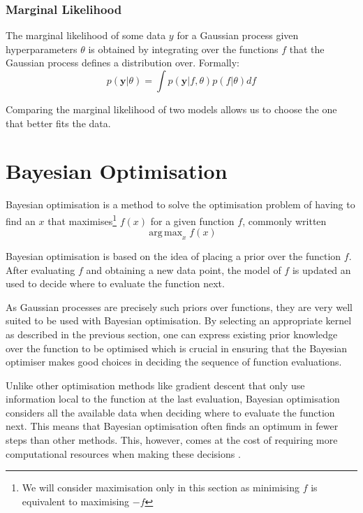 \documentclass[a4paper,12pt,twoside,openright]{report}
\DeclareMathOperator*{\argmax}{arg\,max}
\begin{document}

\subsubsection{Marginal Likelihood}
The marginal likelihood of some data $y$ for a Gaussian process given hyperparameters $\theta$ is obtained by integrating over the functions $f$ that the Gaussian process defines a distribution over. Formally:
\begin{equation}
p(\mathbf{y}|\theta) = \int p(\mathbf{y}|f, \theta)p(f|\theta) df
\end{equation}

Comparing the marginal likelihood of two models allows us to choose the one that better fits the data.

\section{Bayesian Optimisation}

Bayesian optimisation is a method to solve the optimisation problem of having to find an $x$ that maximises\footnote{We will consider maximisation only in this section as minimising $f$ is equivalent to maximising $-f$} $f(x)$ for a given function $f$, commonly written 
\begin{equation}
\argmax_x f(x)
\end{equation}

Bayesian optimisation is based on the idea of placing a prior over the function $f$. After evaluating $f$ and obtaining a new data point, the model of $f$ is updated an used to decide where to evaluate the function next.

As Gaussian processes are precisely such priors over functions, they are very well suited to be used with Bayesian optimisation. By selecting an appropriate kernel as described in the previous section, one can express existing prior knowledge over the function to be optimised which is crucial in ensuring that the Bayesian optimiser makes good choices in deciding the sequence of function evaluations.

Unlike other optimisation methods like gradient descent that only use information local to the function at the last evaluation, Bayesian optimisation considers all the available data when deciding where to evaluate the function next. This means that Bayesian optimisation often finds an optimum in fewer steps than other methods. This, however, comes at the cost of requiring more computational resources when making these decisions \cite{PracticalBayesianOptimization}.
\end{document}
